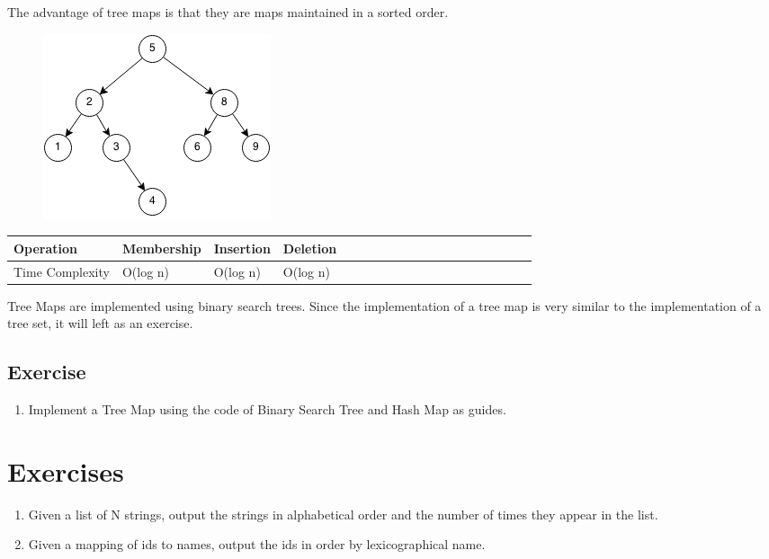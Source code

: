\documentclass[11pt,oneside]{book}
\makeatletter
\def\maxwidth#1{\ifdim\Gin@nat@width>#1 #1\else\Gin@nat@width\fi}
\makeatother
\begin{document}
The advantage of tree maps is that they are maps maintained in a sorted order.

\vspace{5px}\begin{figure}[H]\centering
        \includegraphics[width=0.66\maxwidth{\textwidth}]{bst.png}
        \end{figure}

\begin{center}\begin{tabulary}{0.4\linewidth}{|l|l|l|l|l|l|l|l|l|l|l|l|l|l|l|l|l|l|l}\hline


  Operation &
  Membership &
  Insertion &
  Deletion\\
\hline


  Time Complexity &
  O(log n) &
  O(log n) &
  O(log n)\\

\hline\end{tabulary}\end{center}

Tree Maps are implemented using binary search trees. Since the implementation of a tree map is very similar to the implementation of a tree set, it will left as an exercise.

\subsection{Exercise}

\begin{enumerate}
\item Implement a Tree Map using the code of Binary Search Tree and Hash Map as guides.
\end{enumerate}

        \section{ Exercises }
        

\begin{enumerate}
\item Given a list of N strings, output the strings in alphabetical order and the number of times they appear in the list.
\item Given a mapping of ids to names, output the ids in order by lexicographical name.
\end{enumerate}
\end{document}

